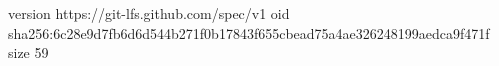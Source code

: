 version https://git-lfs.github.com/spec/v1
oid sha256:6c28e9d7fb6d6d544b271f0b17843f655cbead75a4ae326248199aedca9f471f
size 59

